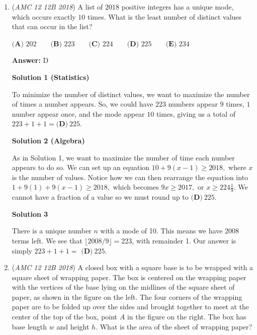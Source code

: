 \begin{enumerate}
 


	\item (\textit{AMC 12 12B 2018}) A list of $2018$ positive integers has a unique mode, which occurs exactly $10$ times. What is the least number of distinct values that can occur in the list?


 $\textbf{(A) }202 \qquad \textbf{(B) }223 \qquad \textbf{(C) }224 \qquad \textbf{(D) }225 \qquad \textbf{(E) }234 \qquad$

 \textbf{Answer: }D



\textbf{Solution 1 (Statistics)}

To minimize the number of distinct values, we want to maximize the number of times a number appears. So, we could have $223$ numbers appear $9$ times, $1$ number appear once, and the mode appear $10$ times, giving us a total of $223 + 1 + 1 = \boxed{\textbf{(D)}\ 225}.$




\textbf{Solution 2 (Algebra)}

As in Solution 1, we want to maximize the number of time each number appears to do so. We can set up an equation $10 + 9( x - 1 )\geq2018,$ where $x$ is the number of values. Notice how we can then rearrange the equation into $1 + 9 ( 1 )+9 ( x - 1 )\geq2018,$ which becomes $9 x\geq2017,$ or $x\geq224\frac19.$ We cannot have a fraction of a value so we must round up to $\boxed{\textbf{(D)}\ 225}.$




\textbf{Solution 3}

There is a unique number \( n \) with a mode of 10. This means we have 2008 terms left. We see that \( \lfloor 2008/9 \rfloor = 223 \), with remainder 1. Our answer is simply \( 223 + 1 + 1 =\) $\boxed{\textbf{(D)}\ 225}.$



	\item (\textit{AMC 12 12B 2018}) A closed box with a square base is to be wrapped with a square sheet of wrapping paper. The box is centered on the wrapping paper with the vertices of the base lying on the midlines of the square sheet of paper, as shown in the figure on the left. The four corners of the wrapping paper are to be folded up over the sides and brought together to meet at the center of the top of the box, point $A$ in the figure on the right. The box has base length $w$ and height $h$. What is the area of the sheet of wrapping paper?



\end{enumerate}
